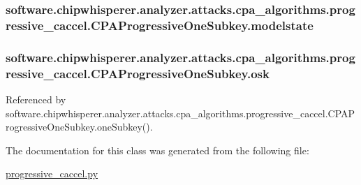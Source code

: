 \subsubsection[{modelstate}]{\setlength{\rightskip}{0pt plus 5cm}software.\+chipwhisperer.\+analyzer.\+attacks.\+cpa\+\_\+algorithms.\+progressive\+\_\+caccel.\+C\+P\+A\+Progressive\+One\+Subkey.\+modelstate}\label{classsoftware_1_1chipwhisperer_1_1analyzer_1_1attacks_1_1cpa__algorithms_1_1progressive__caccel_1_1CPAProgressiveOneSubkey_ad6062fd8c82b37a9b006fcb6f3b589a6}
\hypertarget{classsoftware_1_1chipwhisperer_1_1analyzer_1_1attacks_1_1cpa__algorithms_1_1progressive__caccel_1_1CPAProgressiveOneSubkey_a76d4f5791241c0a5c7b7dda5fc0da0d8}{}
\subsubsection[{osk}]{\setlength{\rightskip}{0pt plus 5cm}software.\+chipwhisperer.\+analyzer.\+attacks.\+cpa\+\_\+algorithms.\+progressive\+\_\+caccel.\+C\+P\+A\+Progressive\+One\+Subkey.\+osk}\label{classsoftware_1_1chipwhisperer_1_1analyzer_1_1attacks_1_1cpa__algorithms_1_1progressive__caccel_1_1CPAProgressiveOneSubkey_a76d4f5791241c0a5c7b7dda5fc0da0d8}


Referenced by software.\+chipwhisperer.\+analyzer.\+attacks.\+cpa\+\_\+algorithms.\+progressive\+\_\+caccel.\+C\+P\+A\+Progressive\+One\+Subkey.\+one\+Subkey().



The documentation for this class was generated from the following file\+:\begin{DoxyCompactItemize}
\item 
\hyperlink{progressive__caccel_8py}{progressive\+\_\+caccel.\+py}\end{DoxyCompactItemize}
